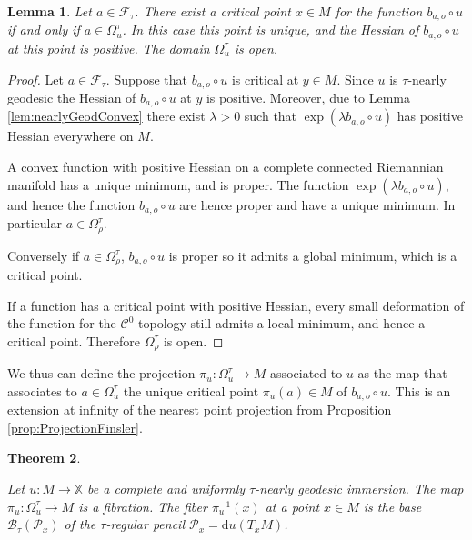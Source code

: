 \documentclass[reqno,10pt]{amsart}
\theoremstyle{plain}
\newtheorem{thm}{Theorem}[section]
\newtheorem{lem}[thm]{Lemma}
\theoremstyle{definition}
\theoremstyle{remark}
\newcommand{\type}{\tau}
\newcommand{\X}{\mathbb{X}}
\begin{document}
\begin{lem}
\label{lem:FibrationCriticalPoints}
Let $a\in \mathcal{F}_\type$. There exist a critical point $x\in M$ for the function $b_{a,o}\circ u$ if and only if $a\in \Omega^\type_u$. In this case this point is unique, and the Hessian of $b_{a,o}\circ u$ at this point is positive. The domain  $\Omega^\type_u$ is open.
\end{lem}

\begin{proof}
Let $a\in \mathcal{F}_\type$. Suppose that $b_{a,o}\circ u$ is critical at $y\in M$. Since $u$ is $\type$-nearly geodesic the Hessian of $b_{a,o}\circ u$ at $y$ is positive. Moreover, due to Lemma \ref{lem:nearlyGeodConvex} there exist $\lambda>0$ such that $\exp\left(\lambda b_{a,o}\circ u\right)$ has positive Hessian everywhere on $M$. 

A convex function with positive Hessian on a complete connected Riemannian manifold has a unique minimum, and is proper. The function $\exp\left(\lambda b_{a,o}\circ u\right)$, and hence the function $b_{a,o}\circ u$ are hence proper and have a unique minimum.  In particular $a\in \Omega^\type_\rho$.

\medskip

Conversely if $a\in \Omega^\type_\rho$, $b_{a,o}\circ u$ is proper so it admits a global minimum, which is a critical point.

\medskip

If a function has a critical point with positive Hessian, every small deformation of the function for the $\mathcal{C}^0$-topology still admits a local minimum, and hence a critical point. Therefore $\Omega^\type_\rho$ is open.
\end{proof}

We thus can define the projection $\pi_u:\Omega^\type_u\to M$ associated to $u$ as the map that associates to  $a\in \Omega^\type_u$ the unique critical point $\pi_u(a)\in M$ of $b_{a,o}\circ u$. This is an extension at infinity of the nearest point projection from Proposition \ref{prop:ProjectionFinsler}.


\begin{thm}
\label{thm:FoliationDoD}

Let $u:M\to \X$ be a complete and uniformly $\type$-nearly geodesic immersion. The map $\pi_u:\Omega^\type_u\to M$ is a fibration. The fiber $\pi_u^{-1}(x)$ at a point $x\in M$ is the base $\mathcal{B}_\type(\mathcal{P}_x)$ of the $\type$-regular pencil $\mathcal{P}_x=\mathrm{d}u(T_xM)$.

\end{thm}
\end{document}
